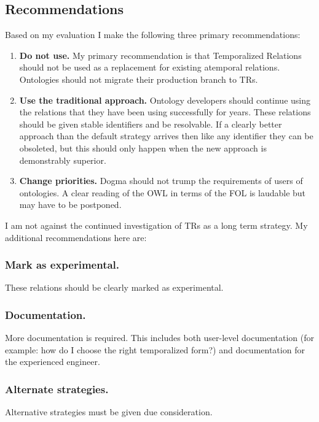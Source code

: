 \documentclass{bioinfo}
\begin{document}
\subsection{Recommendations}

Based on my evaluation I make the following three primary
recommendations:

\begin{enumerate}

\item \textbf{Do not use.} My primary recommendation is that
  Temporalized Relations should not be used as a replacement for
  existing atemporal relations. Ontologies should not migrate their
  production branch to TRs.

\item \textbf{Use the traditional approach.} Ontology developers
  should continue using the relations that they have been using
  successfully for years. These relations should be given stable
  identifiers and be resolvable. If a clearly better approach than the
  default strategy arrives then like any identifier they can be
  obsoleted, but this should only happen when the new approach is
  demonstrably superior.

\item \textbf{Change priorities.} Dogma should not trump the
  requirements of users of ontologies. A clear reading of the OWL in
  terms of the FOL is laudable but may have to be postponed.

\end{enumerate}


I am not against the continued investigation of TRs as a long term
strategy. My additional recommendations here are:

\subsubsection{Mark as experimental.} These relations should be clearly
marked as experimental.

\subsubsection{Documentation.} More documentation is required. This
includes both user-level documentation (for example: how do I choose
the right temporalized form?) and documentation for the experienced
engineer.

\subsubsection{Alternate strategies.} Alternative strategies must be
given due consideration.
\end{document}
